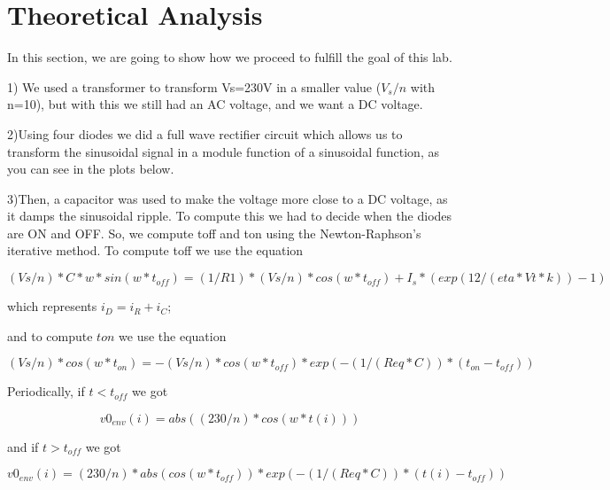 \section{Theoretical Analysis}
\label{Teorica}
In this section, we are going to show how we proceed to fulfill the goal of this lab.

\par 1) We used a transformer to transform Vs=230V in a smaller value ($V_{s}/n$ with n=10), but with this we still had an AC voltage, and we want a DC voltage.
 \par
 2)Using four diodes we did a full wave rectifier circuit which allows us to transform the sinusoidal signal in a module function of a sinusoidal function, as you can see in the plots below.
 \par
 3)Then, a capacitor was used to make the voltage more close to a DC voltage, as it damps the sinusoidal ripple. To compute this we had to decide when the diodes are ON and OFF. So, we compute toff and ton using the Newton-Raphson's iterative method. To compute toff we use the equation 
 
 \begin{equation}
 (Vs/n)*C*w*sin(w*t_{off}) = (1/R1)*(Vs/n)*cos(w*t_{off}) + I_s*(exp(12/(eta*Vt*k))-1)
 \end{equation} 
 
 
 
 
 which represents $i_{D} = i_{R} + i_{C}$; 
 
 
 and to compute $ton$ we use the equation 
 
 \begin{equation}
 (Vs/n)*cos(w*t_{on})=-(Vs/n)*cos(w*t_{off})*exp(-(1/(Req*C))*(t_{on}-t_{off})) 
 \end{equation}
 
 
 Periodically, if $t<t_{off}$ we got 
 
 \begin{equation}
 v0_{env}(i) = abs((230/n)*cos(w*t(i))) 
 \end{equation}
 
 and if $t>t_{off}$ we got  
 
 \begin{equation}
 v0_{env}(i) = (230/n)*abs(cos(w*t_{off}))*exp(-(1/(Req*C))*(t(i)-t_{off}))
 \end{equation}
 
